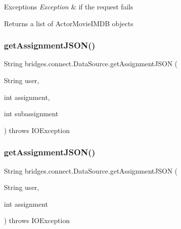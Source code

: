 \begin{DoxyExceptions}{Exceptions}
{\em Exception} & if the request fails\\
\hline
\end{DoxyExceptions}
\begin{DoxyReturn}{Returns}
a list of Actor\+Movie\+I\+M\+DB objects 
\end{DoxyReturn}
\mbox{\label{classbridges_1_1connect_1_1_data_source_af2f6cd7172acb64b2ba49f134b5391f8}} 
\subsubsection{\texorpdfstring{get\+Assignment\+J\+S\+O\+N()}{getAssignmentJSON()}\hspace{0.1cm}{\footnotesize\ttfamily [1/2]}}
{\footnotesize\ttfamily String bridges.\+connect.\+Data\+Source.\+get\+Assignment\+J\+S\+ON (\begin{DoxyParamCaption}\item[{String}]{user,  }\item[{int}]{assignment,  }\item[{int}]{subassignment }\end{DoxyParamCaption}) throws I\+O\+Exception}

\mbox{\label{classbridges_1_1connect_1_1_data_source_af55c85da71b588f64ff4b46dbacab7f4}} 
\subsubsection{\texorpdfstring{get\+Assignment\+J\+S\+O\+N()}{getAssignmentJSON()}\hspace{0.1cm}{\footnotesize\ttfamily [2/2]}}
{\footnotesize\ttfamily String bridges.\+connect.\+Data\+Source.\+get\+Assignment\+J\+S\+ON (\begin{DoxyParamCaption}\item[{String}]{user,  }\item[{int}]{assignment }\end{DoxyParamCaption}) throws I\+O\+Exception}

